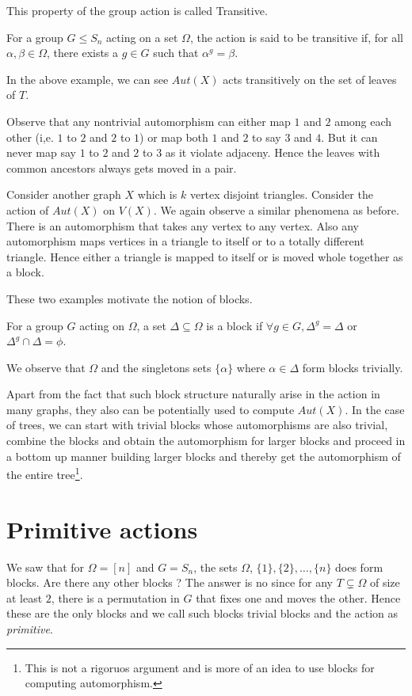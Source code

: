 This property of the group action is called Transitive.
\begin{definition}
	For a group $G \le S_n$ acting on a set $\Omega$, the action is said
	to be transitive if, for all $\alpha, \beta \in \Omega$, there exists
	a $g \in G$ such that $\alpha^g = \beta$.
\end{definition}
In the above example, we can see $Aut(X)$ acts transitively on the set of
leaves of $T$.

Observe that any nontrivial automorphism can either map $1$ and $2$ among
each other (i,e. $1$ to $2$ and $2$ to $1$) or map both $1$ and $2$ to say
$3$ and $4$. But it can never map say $1$ to $2$ and $2$ to $3$ as it violate
adjaceny. Hence the leaves with common ancestors always gets moved in a pair.

Consider another graph $X$ which is $k$ vertex disjoint triangles. Consider
the action of $Aut(X)$ on $V(X)$. We again observe a similar phenomena as
before. There is an automorphism that takes any vertex to any vertex. Also
any automorphism maps vertices in a triangle to itself or to a totally 
different triangle. Hence either a triangle is mapped to itself or is moved
whole together as a block.

These two examples motivate the notion of blocks.

\begin{definition}[Blocks]
	For a group $G$ acting on $\Omega$, a set $\Delta \subseteq \Omega$ 
	is a block if $\forall g \in G, \Delta^g = \Delta$ or 
	$\Delta^g \cap \Delta = \phi$.
\end{definition}
We observe that $\Omega$ and the singletons sets $\{\alpha\}$
where $\alpha \in \Delta$ form blocks trivially. 

Apart from the fact that such block structure naturally arise in the action
in many graphs, they also can be potentially used to compute $Aut(X)$. In the
case of trees, we can start with trivial blocks whose automorphisms are also
trivial, combine the blocks and obtain the automorphism for larger blocks and
proceed in a bottom up manner building larger blocks and thereby get the
automorphism of the entire tree\footnote{This is not a rigoruos argument and
is more of an idea to use blocks for computing automorphism.}.

\section{Primitive actions}
We saw that for $\Omega = [n]$ and $G = S_n$, the sets $\Omega$, $\{1\}, \{2\},
\ldots, \{n\}$ does form blocks. Are there any other blocks ? The answer is
no since for any $T \subsetneq \Omega$ of size at least $2$, there is a
permutation in $G$ that fixes one and moves the other. Hence these are the only
blocks and we call such blocks trivial blocks and the action as
\emph{primitive}.


